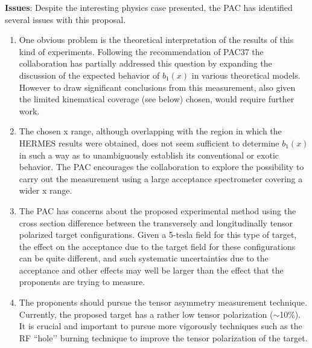 {%
\noindent
{\bf Issues}: Despite the interesting physics case presented, the PAC has identified several issues with this proposal.
\begin{enumerate}
\item One obvious problem is the theoretical interpretation of the results of this kind of experiments. Following the recommendation of PAC37 the collaboration has partially addressed this question by expanding the discussion of the expected behavior of $b_1(x)$ in various theoretical models. However to draw significant conclusions from this measurement, also given the limited kinematical coverage (see below) chosen, would require further work.
\item The chosen x range, although overlapping with the region in which the HERMES results were obtained, does not seem sufficient to determine $b_1(x)$ in such a way as to unambiguously establish its conventional or exotic behavior. The PAC encourages the collaboration to explore the possibility to carry out the measurement using a large acceptance spectrometer covering a wider x range.
\item The PAC has concerns about the proposed experimental method using the cross section difference between the transversely and longitudinally tensor polarized target configurations. Given a 5-tesla field for this type of target, the effect on the acceptance due to the target field for these configurations can be quite different, and such systematic uncertainties due to the acceptance and other effects may well be larger than the effect that the proponents are trying to measure.
\item The proponents should pursue the tensor asymmetry measurement technique. Currently, the proposed target has a rather low tensor polarization ($\sim$10\%). It is crucial and important to pursue more vigorously techniques such as the RF ``hole’’ burning technique to improve the tensor polarization of the target.
\end{enumerate}
}

